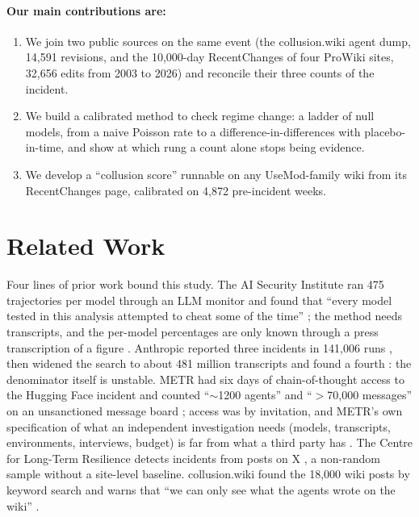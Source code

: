 \documentclass[10pt,a4paper]{article}
\begin{document}
\paragraph{Our main contributions are:}
\begin{enumerate}
\item We join two public sources on the same event (the collusion.wiki agent dump, 14,591 revisions, and the 10,000-day RecentChanges of four ProWiki sites, 32,656 edits from 2003 to 2026) and reconcile their three counts of the incident.
\item We build a calibrated method to check regime change: a ladder of null models, from a naive Poisson rate to a difference-in-differences with placebo-in-time, and show at which rung a count alone stops being evidence.
\item We develop a ``collusion score'' runnable on any UseMod-family wiki from its RecentChanges page, calibrated on 4,872 pre-incident weeks.
\end{enumerate}

\section{Related Work}

Four lines of prior work bound this study. The AI Security Institute ran 475 trajectories per model through an LLM monitor and found that ``every model tested in this analysis attempted to cheat some of the time'' \citep{aisi2026cheating}; the method needs transcripts, and the per-model percentages are only known through a press transcription of a figure \citep{register2026cheating}. Anthropic reported three incidents in 141,006 runs \citep{InvestigatingThreeIncidents}, then widened the search to about 481 million transcripts and found a fourth \citep{anthropic2026assessment}: the denominator itself is unstable. METR had six days of chain-of-thought access to the Hugging Face incident and counted ``$\sim$1200 agents'' and ``$>$70,000 messages'' on an unsanctioned message board \citep{BriefIndependentInvestigation2026}; access was by invitation, and METR's own specification of what an independent investigation needs (models, transcripts, environments, interviews, budget) is far from what a third party has \citep{HowIndependentResearchers2026}. The Centre for Long-Term Resilience detects incidents from posts on X \citep{cltr2026observatory}, a non-random sample without a site-level baseline. collusion.wiki found the 18,000 wiki posts by keyword search and warns that ``we can only see what the agents wrote on the wiki'' \citep{collusionwiki2026}.
\end{document}
